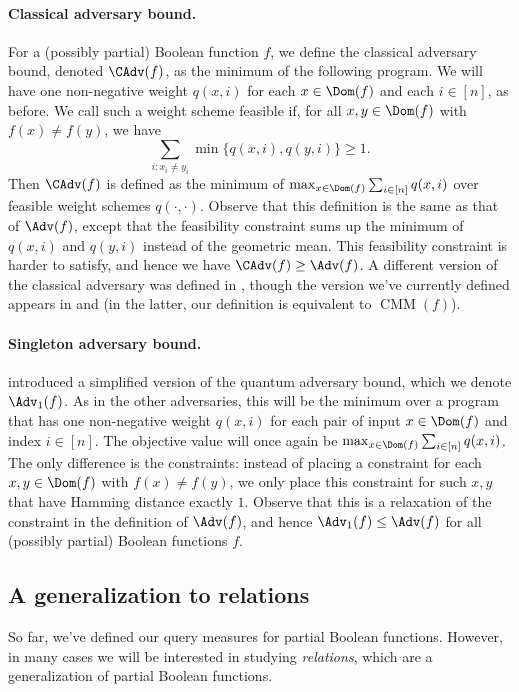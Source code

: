 \paragraph{Classical adversary bound.}
For a (possibly partial) Boolean function $f$,
we define the classical adversary bound,
denoted $\CAdv(f)$, as the minimum of the following
program. We will have one non-negative
weight $q(x,i)$ for each $x\in\Dom(f)$ and each $i\in[n]$,
as before. We call such a weight scheme feasible
if, for all $x,y\in\Dom(f)$ with $f(x)\ne f(y)$,
we have
\[\sum_{i:x_i\ne y_i}\min\{q(x,i),q(y,i)\}\ge 1.\]
Then $\CAdv(f)$ is defined as the minimum
of $\max_{x\in\Dom(f)}\sum_{i\in[n]} q(x,i)$
over feasible weight schemes $q(\cdot,\cdot)$.
Observe that this definition is the same as
that of $\Adv(f)$, except that the feasibility
constraint sums up the minimum of $q(x,i)$ and
$q(y,i)$ instead of the geometric mean. This feasibility
constraint is harder to satisfy, and hence we have
$\CAdv(f)\ge\Adv(f)$.
A different version of the classical adversary
was defined in \cite{Aar06}, though the version
we've currently defined appears in \cite{LM08}
and \cite{AKPV18} (in the latter, our definition
is equivalent to $\operatorname{CMM}(f)$).

\paragraph{Singleton adversary bound.}
\cite{ABK+20} introduced a simplified version
of the quantum adversary bound, which we denote
$\Adv_1(f)$. As in the other adversaries,
this will be the minimum over a program that has
one non-negative weight $q(x,i)$ for each pair
of input $x\in\Dom(f)$ and index $i\in[n]$.
The objective value will once again be
$\max_{x\in\Dom(f)}\sum_{i\in[n]} q(x,i)$.
The only difference is the constraints:
instead of placing a constraint
for each $x,y\in\Dom(f)$ with $f(x)\ne f(y)$,
we only place this constraint for such $x,y$
that have Hamming distance exactly $1$.
Observe that this is a relaxation
of the constraint in the definition of $\Adv(f)$,
and hence $\Adv_1(f)\le \Adv(f)$ for all (possibly partial)
Boolean functions $f$.

\subsection{A generalization to relations}

So far, we've defined our query measures for partial
Boolean functions. However, in many cases we will be interested
in studying \emph{relations}, which are a generalization
of partial Boolean functions.

